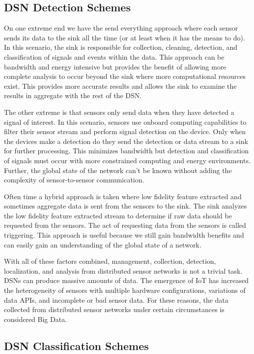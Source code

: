 \subsection{DSN Detection Schemes}
On one extreme end we have the send everything approach where each sensor sends its data to the sink all the time (or at least when it has the means to do). In this scenario, the sink is responsible for collection, cleaning, detection, and classification of signals and events within the data. This approach can be bandwidth and energy intensive but provides the benefit of allowing more complete analysis to occur beyond the sink where more computational resources exist. This provides more accurate results and allows the sink to examine the results in aggregate with the rest of the DSN.

The other extreme is that sensors only send data when they have detected a signal of interest. In this scenario, sensors use onboard computing capabilities to filter their sensor stream and perform signal detection on the device. Only when the devices make a detection do they send the detection or data stream to a sink for further processing. This minimizes bandwidth but detection and classification of signals must occur with more constrained computing and energy environments. Further, the global state of the network can't be known without adding the complexity of sensor-to-sensor communication.

Often time a hybrid approach is taken where low fidelity feature extracted and sometimes aggregate data is sent from the sensors to the sink. The sink analyzes the low fidelity feature extracted stream to determine if raw data should be requested from the sensors. The act of requesting data from the sensors is called triggering. This approach is useful because we still gain bandwidth benefits and can easily gain an understanding of the global state of a network.

With all of these factors combined, management, collection, detection, localization, and analysis from distributed sensor networks is not a trivial task. DSNs can produce massive amounts of data. The emergence of IoT has increased the heterogeneity of sensors with multiple hardware configurations, variations of data APIs, and incomplete or bad sensor data. For these reasons, the data collected from distributed sensor networks under certain circumstances is considered Big Data.

\subsection{DSN Classification Schemes}

